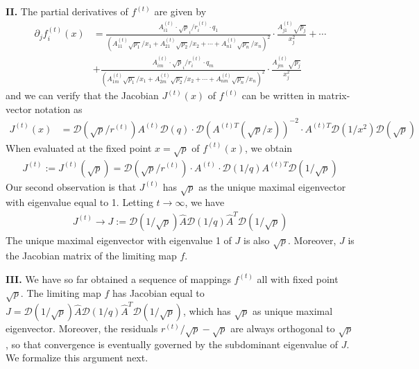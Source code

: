 \textbf{II. }The partial derivatives of $f^{(t)}$ are given by 
\begin{align*}
\partial_{j}f_{i}^{(t)}(x) & =\frac{A_{i1}^{(t)}\cdot\sqrt{p}_{i}/r_{i}^{(t)}\cdot q_{1}}{(A_{11}^{(t)}\sqrt{p_{1}}/x_{1}+A_{21}^{(t)}\sqrt{p_{2}}/x_{2}+\cdots+A_{n1}^{(t)}\sqrt{p_{n}}/x_{n})^{2}}\cdot\frac{A_{j1}^{(t)}\sqrt{p_{j}}}{x_{j}^{2}}+\cdots\\
 & +\frac{A_{im}^{(t)}\cdot\sqrt{p}_{i}/r_{i}^{(t)}\cdot q_{m}}{(A_{1m}^{(t)}\sqrt{p_{1}}/x_{1}+A_{2m}^{(t)}\sqrt{p_{2}}/x_{2}+\cdots+A_{nm}^{(t)}\sqrt{p_{n}}/x_{n})^{2}}\cdot\frac{A_{jm}^{(t)}\sqrt{p_{j}}}{x_{j}^{2}}
\end{align*}
and we can verify that the Jacobian $J^{(t)}(x)$ of $f^{(t)}$ can
be written in matrix-vector notation as 
\begin{align*}
J^{(t)}(x) & =\mathcal{D}(\sqrt{p}/r^{(t)})A^{(t)}\mathcal{D}(q)\cdot\mathcal{D}(A^{(t)T}(\sqrt{p}/x))^{-2}\cdot A^{(t)T}\mathcal{D}(1/x^{2})\mathcal{D}(\sqrt{p})
\end{align*}
When evaluated at the fixed point $x=\sqrt{p}$ of $f^{(t)}(x)$,
we obtain 
\begin{align*}
J^{(t)}:=J^{(t)}(\sqrt{p})=\mathcal{D}(\sqrt{p}/r^{(t)})\cdot A^{(t)}\cdot\mathcal{D}(1/q)A^{(t)T}\mathcal{D}(1/\sqrt{p})
\end{align*}
Our second observation is that $J^{(t)}$ has $\sqrt{p}$ as the unique
maximal eigenvector with eigenvalue equal to 1. Letting $t\rightarrow\infty$,
we have
\begin{align*}
J^{(t)}\rightarrow J:=\mathcal{D}(1/\sqrt{p})\hat{A}\mathcal{D}(1/q)\hat{A}^{T}\mathcal{D}(1/\sqrt{p})
\end{align*}
The unique maximal eigenvector with eigenvalue 1 of $J$ is also $\sqrt{p}$.
Moreover, $J$ is the Jacobian matrix of the limiting map $f$. 

\textbf{III. }We have so far obtained a sequence of mappings $f^{(t)}$
all with fixed point $\sqrt{p}$. The limiting map $f$ has Jacobian
equal to $J=\mathcal{D}(1/\sqrt{p})\hat{A}\mathcal{D}(1/q)\hat{A}^{T}\mathcal{D}(1/\sqrt{p})$,
which has $\sqrt{p}$ as unique maximal eigenvector. Moreover, the
residuals $r^{(t)}/\sqrt{p}-\sqrt{p}$ are always orthogonal to $\sqrt{p}$,
so that convergence is eventually governed by the subdominant eigenvalue
of $J$. We formalize this argument next.\textbf{ }

